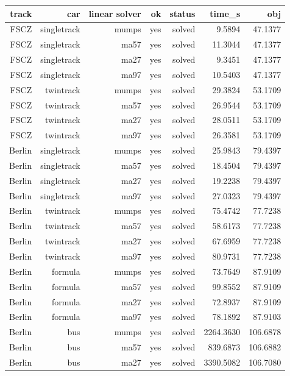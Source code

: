 {\footnotesize
\begin{longtable}{|r|r|r|r|r|r|r|}
  \hline
  \textbf{track} & \textbf{car} & \textbf{linear solver} & \textbf{ok} & \textbf{status} & \textbf{time\_s} & \textbf{obj} \\
  \hline
  FSCZ & singletrack & mumps & yes & solved & 9.5894 & 47.1377 \\
  FSCZ & singletrack & ma57 & yes & solved & 11.3044 & 47.1377 \\
  FSCZ & singletrack & ma27 & yes & solved & 9.3451 & 47.1377 \\
  FSCZ & singletrack & ma97 & yes & solved & 10.5403 & 47.1377 \\
  FSCZ & twintrack & mumps & yes & solved & 29.3824 & 53.1709 \\
  FSCZ & twintrack & ma57 & yes & solved & 26.9544 & 53.1709 \\
  FSCZ & twintrack & ma27 & yes & solved & 28.0511 & 53.1709 \\
  FSCZ & twintrack & ma97 & yes & solved & 26.3581 & 53.1709 \\
  Berlin & singletrack & mumps & yes & solved & 25.9843 & 79.4397 \\
  Berlin & singletrack & ma57 & yes & solved & 18.4504 & 79.4397 \\
  Berlin & singletrack & ma27 & yes & solved & 19.2238 & 79.4397 \\
  Berlin & singletrack & ma97 & yes & solved & 27.0323 & 79.4397 \\
  Berlin & twintrack & mumps & yes & solved & 75.4742 & 77.7238 \\
  Berlin & twintrack & ma57 & yes & solved & 58.6173 & 77.7238 \\
  Berlin & twintrack & ma27 & yes & solved & 67.6959 & 77.7238 \\
  Berlin & twintrack & ma97 & yes & solved & 80.9731 & 77.7238 \\
  Berlin & formula & mumps & yes & solved & 73.7649 & 87.9109 \\
  Berlin & formula & ma57 & yes & solved & 99.8552 & 87.9109 \\
  Berlin & formula & ma27 & yes & solved & 72.8937 & 87.9109 \\
  Berlin & formula & ma97 & yes & solved & 78.1892 & 87.9103 \\
  Berlin & bus & mumps & yes & solved & 2264.3630 & 106.6878 \\
  Berlin & bus & ma57 & yes & solved & 839.6873 & 106.6882 \\
  Berlin & bus & ma27 & yes & solved & 3390.5082 & 106.7080 \\

\end{longtable}}
